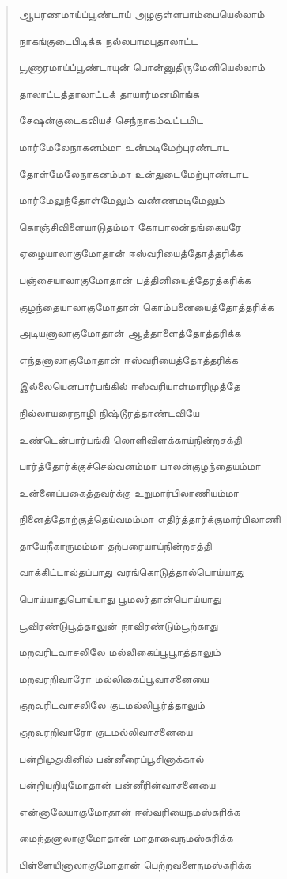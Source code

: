 \documentclass{article}
\begin{document}
\begin{quotation}
{ஆபரணமாய்ப்பூண்டாய் அழகுள்ளபாம்பையெல்லாம்

நாகங்குடைபிடிக்க நல்லபாமபுதாலாட்ட

பூணாரமாய்ப்பூண்டாயுன் பொன்னுதிருமேனியெல்லாம்

தாலாட்டத்தாலாட்டக் தாயார்மனமிாங்க

சேஷன்குடைகவியச் செந்நாகம்வட்டமிட

மார்மேலேநாகனம்மா உன்மடிமேற்புரண்டாட

தோள்மேலேநாகனம்மா உன்துடைமேற்புாண்டாட

மார்மேலுந்தோள்மேலும் வண்ணமடிமேலும்

கொஞ்சிவிளையாடுதம்மா கோபாலன்தங்கையரே

ஏழையாலாகுமோதான் ஈஸ்வரியைத்தோத்தரிக்க

பஞ்சையாலாகுமோதான்‌ பத்தினியைத்தேரத்கரிக்க

குழந்தையாலாகுமோதான் கொம்பனையைத்தோத்தரிக்க

அடியனாலாகுமோதான் ஆத்தாளைத்தோத்தரிக்க

எந்தனாலாகுமோதான் ஈஸ்வரியைத்தோத்தரிக்க

இல்லையெனபார்பங்கில் ஈஸ்வரியாள்மாரிமுத்தே

நில்லாயரைநாழி நிஷ்டூரத்தாண்டவியே

உண்டென்பார்பங்கி லொளிவிளக்காய்நின்றசக்தி

பார்த்தோர்க்குச்செல்வனம்மா பாலன்குழந்தையம்மா

உன்னைப்பகைத்தவர்க்கு உறுமார்பிலாணியம்மா

நினைத்தோற்குத்தெய்வமம்மா எதிர்த்தார்க்குமார்பிலாணி

தாயேநீகாருமம்மா தற்பரையாய்நின்றசத்தி

வாக்கிட்டால்தப்பாது வரங்கொடுத்தால்பொய்யாது

பொய்யாதுபொய்யாது பூமலர்தான்பொய்யாது

பூவிரண்டுபூத்தாலுன் நாவிரண்டும்பூற்காது

மறவரிடவாசலிலே மல்லிகைப்பூபூாத்தாலும்

மறவரறிவாரோ மல்லிகைப்பூவாசனையை

குறவரிடவாசலிலே குடமல்லிபூர்த்தாலும்

குறவரறிவாரோ குடமல்லிவாசனையை

பன்றிமுதுகினில் பன்னீரைப்பூசினாக்கால்

பன்றியறியுமோதான் பன்னீரின்வாசனையை

என்னாலேயாகுமோதான் ஈஸ்வரியைநமஸ்கரிக்க

மைந்தனாலாகுமோதான் மாதாவைநமஸ்கரிக்க

பிள்ளையினாலாகுமோதான் பெற்றவளைநமஸ்கரிக்க

}
\end{quotation}
\end{document}
